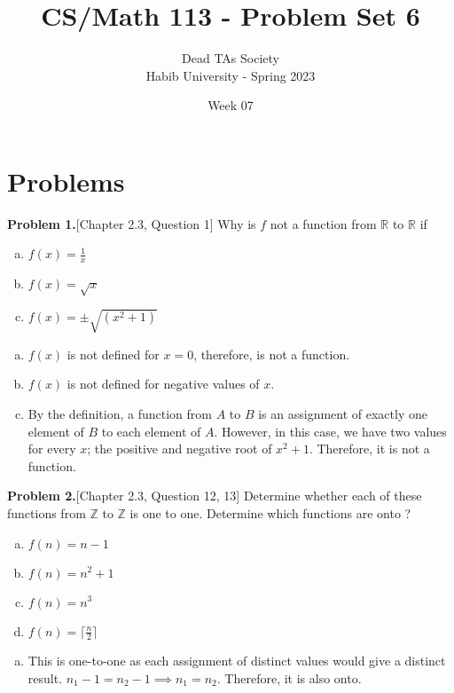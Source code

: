 \documentclass[addpoints]{exam}
\title{CS/Math 113 - Problem Set 6}
\author{Dead TAs Society \\ Habib University - Spring 2023}
\date{Week 07}
\begin{document}
\maketitle
\begin{sloppypar}
\section*{Problems}
\begin{questions}
    \question\textbf{Problem 1.}[Chapter 2.3, Question 1]
    Why is $f$ not a function from $\mathbb{R}$ to $\mathbb{R}$ if 
    \begin{enumerate}[(a)]
        \item $ f(x) = \frac{1}{x}$
        \item $ f(x) = \sqrt{x}$
        \item $ f(x) = \pm  \sqrt{(x^2 + 1)}$
    \end{enumerate}
        \begin{solution}
            \begin{enumerate}[(a)]
                \item $f(x)$ is not defined for $x = 0$, therefore, is not a function.
                \item $f(x)$ is not defined for negative values of $x$.
                \item By the definition, a function from $A$ to $B$ is an assignment of exactly one element of $B$ to each element of $A$. However, in this case, we have two values for every $x$; the positive and negative root of $ x^2 + 1 $. Therefore, it is not a function.
            \end{enumerate}
        \end{solution}
    \question\textbf{Problem 2.}[Chapter 2.3, Question 12, 13]
Determine whether each of these functions from $\mathbb{Z}$ to $\mathbb{Z}$ is one to one. Determine which functions are onto ?
\begin{enumerate}[(a)]
    \item $f(n) = n - 1$
    \item $f(n) = n^2 + 1$
    \item $f(n) = n^3 $
    \item $f(n) = \lceil \frac{n}{2} \rceil $
\end{enumerate}
        \begin{solution}
            \begin{enumerate}[(a)]
                \item This is one-to-one as each assignment of distinct values would give a distinct result. $ n_1 -1 = n_2 -1 \implies n_1 = n_2 $. Therefore, it is also onto.

\end{enumerate}
\end{solution}
\end{questions}
\end{sloppypar}
\end{document}
